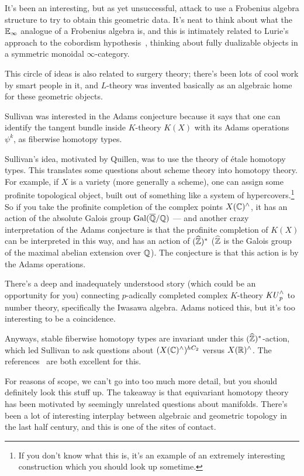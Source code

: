 It's been an interesting, but as yet unsuccessful, attack to use a Frobenius algebra structure to try to obtain
this geometric data. It's neat to think about what the $\mathbb E_\infty$ analogue of a Frobenius algebra is, and this is
intimately related to Lurie's approach to the cobordism hypothesis~\cite{Lur09}, thinking about fully dualizable
objects in a symmetric monoidal $\infty$-category.

This circle of ideas is also related to surgery theory; there's been lots of cool work by smart people in it, and
$L$-theory was invented basically as an algebraic home for these geometric objects.

Sullivan was interested in the Adams conjecture because it says that one can identify the tangent bundle inside
$K$-theory $K(X)$ with its Adams operations $\psi^k$, as fiberwise homotopy
types.

Sullivan's idea, motivated by Quillen, was to use the theory of étale homotopy types. This translates some questions about scheme theory into homotopy theory. For example, if
$X$ is a variety (more generally a scheme), one can assign some profinite topological object, built out of
something like a system of hypercovers.\footnote{If you don't know what this is, it's an example of an extremely
interesting construction which you should look up sometime.} So if you take the profinite completion of the complex
points $X(\mathbb C)^\land$, it has an action of the absolute Galois group $\operatorname{Gal}(\overline{\mathbb Q}/\mathbb Q)$ --- and another crazy
interpretation of the Adams conjecture is that the profinite completion of $K(X)$ can be interpreted in this way,
and has an action of $(\widehat{\mathbb Z})^*$ ($\widehat{\mathbb Z}$ is the Galois group of the maximal abelian extension over
$\mathbb Q$). The conjecture is that this action is by the Adams operations.

There's a deep and inadequately understood story (which could be an opportunity for you) connecting $p$-adically
completed complex $K$-theory $\mathit{KU}_p^\land$ to number theory, specifically the Iwasawa algebra. Adams noticed this,
but it's too interesting to be a coincidence.

Anyways, stable fiberwise homotopy types are invariant under this $(\widehat{\mathbb Z})^*$-action, which led Sullivan to
ask questions about $(X(\mathbb C)^\wedge)^{hC_2}$ versus $X(\mathbb R)^\wedge$. The references~\cite{MITNotes, Genetics} are
both excellent for this.

For reasons of scope, we can't go into too much more detail, but you should definitely look this stuff up. The
takeaway is that equivariant homotopy theory has been motivated by seemingly unrelated questions about manifolds.
There's been a lot of interesting interplay between algebraic and geometric topology in the last half century, and
this is one of the sites of contact.
